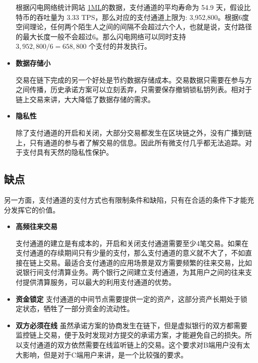 \begin{itemize}
        根据闪电网络统计网站 \href{https://1ml.com/statistics}{1ML}的数据，支付通道的平均寿命为 54.9 天，假设比特币的吞吐量为 3.33 TPS，那么对应的支付通道上限为: 3,952,800。根据6度空间理论，任何两个陌生人之间的间隔不会超过六个人，也就是说，支付路径的最大长度一般不会超过6。那么闪电网络可以同时支持 $3,952,800/6 = 658,800$ 个支付的并发执行。
        
      \item \textbf{数据存储小}

        交易在链下完成的另一个好处是节约数据存储成本。交易数据只需要在参与方之间传播，历史承诺方案可以立刻丢弃，只需要保存撤销锁私钥列表。相对于链上交易来讲，大大降低了数据存储的需求。

      \item \textbf{隐私性}

        除了支付通道的开启和关闭，大部分交易都发生在区块链之外，没有广播到链上，只有通道的参与者了解交易的信息。因此所有微支付几乎都无法追踪。对于支付具有天然的隐私性保护。

\end{itemize}

\subsection{缺点}

另一方面，支付通道的支付方式也有限制条件和缺陷，只有在合适的条件下才能充分发挥它的价值。

\begin{itemize}
    \item \textbf{高频往来交易}

        支付通道的建立是有成本的，开启和关闭支付通道需要至少4笔交易。如果在支付通道的存续期间只有少量的支付，那么支付通道的意义就不大了，不如直接在链上交易。最适合支付通道的应用场景是双方需要频繁的往来交易，比如说银行间支付清算业务。两个银行之间建立支付通道，为其用户之间的往来支付提供清算服务，可以最大的利用支付通道的优势。

    \item \textbf{资金锁定}
        支付通道的中间节点需要提供一定的资产，这部分资产长期处于锁定状态，牺牲了一部分资金的流动性。
    
    \item \textbf{双方必须在线}
        虽然承诺方案的协商发生在链下，但是虚拟银行的双方都需要监控链上交易，便于及时发现对方提交的承诺方案，才能避免自己的损失。所以支付通道的双方依然需要在线监听链上的交易。这个要求对B端用户没有太大影响，但是对于C端用户来讲，是一个比较强的要求。

\end{itemize}

